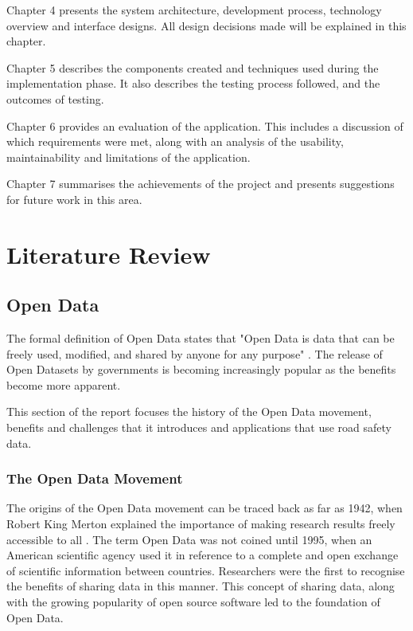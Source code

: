 \documentclass[authoryearcitations]{UoYCSproject}
\begin{document}
Chapter 4 presents the system architecture, development process, technology overview and interface designs. All design decisions made will be explained in this chapter.

Chapter 5 describes the components created and techniques used during the implementation phase. It also describes the testing process followed, and the outcomes of testing.

Chapter 6 provides an evaluation of the application. This includes a discussion of which requirements were met, along with an analysis of the usability, maintainability and limitations of the application.

Chapter 7 summarises the achievements of the project and presents suggestions for future work in this area.

\chapter{Literature Review}

\section{Open Data}

The formal definition of Open Data states that "Open Data is data that can be freely used, modified, and shared by anyone for any purpose" \citep{OpenKnowledge}. The release of Open Datasets by governments is becoming increasingly popular as the benefits become more apparent.

This section of the report focuses the history of the Open Data movement, benefits and challenges that it introduces and applications that use road safety data.

\subsection{The Open Data Movement}

The origins of the Open Data movement can be traced back as far as 1942, when Robert King Merton explained the importance of making research results freely accessible to all \citep{Chignard2013}. The term Open Data was not coined until 1995, when an American scientific agency used it in reference to a complete and open exchange of scientific information between countries. Researchers were the first to recognise the benefits of sharing data in this manner. This concept of sharing data, along with the growing popularity of open source software led to the foundation of Open Data.
\end{document}
